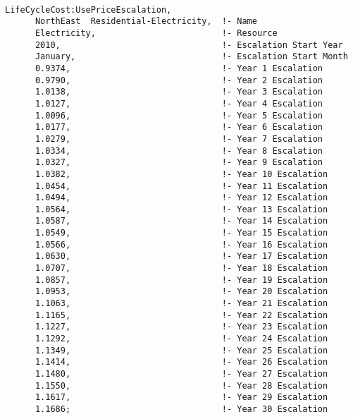 \begin{lstlisting}

LifeCycleCost:UsePriceEscalation,
      NorthEast  Residential-Electricity,  !- Name
      Electricity,                         !- Resource
      2010,                                !- Escalation Start Year
      January,                             !- Escalation Start Month
      0.9374,                              !- Year 1 Escalation
      0.9790,                              !- Year 2 Escalation
      1.0138,                              !- Year 3 Escalation
      1.0127,                              !- Year 4 Escalation
      1.0096,                              !- Year 5 Escalation
      1.0177,                              !- Year 6 Escalation
      1.0279,                              !- Year 7 Escalation
      1.0334,                              !- Year 8 Escalation
      1.0327,                              !- Year 9 Escalation
      1.0382,                              !- Year 10 Escalation
      1.0454,                              !- Year 11 Escalation
      1.0494,                              !- Year 12 Escalation
      1.0564,                              !- Year 13 Escalation
      1.0587,                              !- Year 14 Escalation
      1.0549,                              !- Year 15 Escalation
      1.0566,                              !- Year 16 Escalation
      1.0630,                              !- Year 17 Escalation
      1.0707,                              !- Year 18 Escalation
      1.0857,                              !- Year 19 Escalation
      1.0953,                              !- Year 20 Escalation
      1.1063,                              !- Year 21 Escalation
      1.1165,                              !- Year 22 Escalation
      1.1227,                              !- Year 23 Escalation
      1.1292,                              !- Year 24 Escalation
      1.1349,                              !- Year 25 Escalation
      1.1414,                              !- Year 26 Escalation
      1.1480,                              !- Year 27 Escalation
      1.1550,                              !- Year 28 Escalation
      1.1617,                              !- Year 29 Escalation
      1.1686;                              !- Year 30 Escalation
\end{lstlisting}
